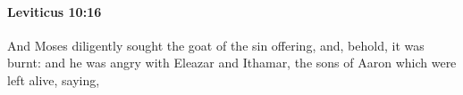 
		\paragraph{Leviticus 10:16} %
			\label{LEVITICUS-10-16}

			And Moses diligently sought the goat of the sin offering, and, behold, it was burnt: and he was angry with Eleazar and Ithamar, the sons of Aaron which were left alive, saying,


